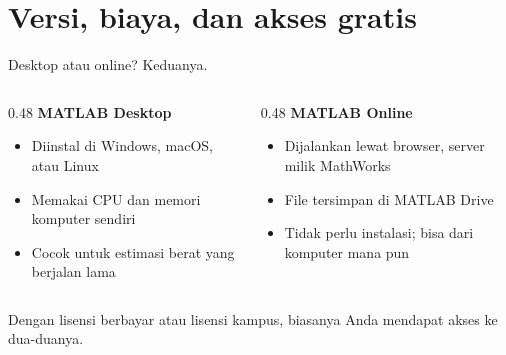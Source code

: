 \documentclass[aspectratio=169,11pt]{beamer}
\begin{document}
\section{Versi, biaya, dan akses gratis}

\begin{frame}{Desktop atau online? Keduanya.}
\begin{columns}[T]
\begin{column}{0.48\textwidth}
\textbf{MATLAB Desktop}
\begin{itemize}\small
  \item Diinstal di Windows, macOS, atau Linux
  \item Memakai CPU dan memori komputer sendiri
  \item Cocok untuk estimasi berat yang berjalan lama
\end{itemize}
\end{column}
\begin{column}{0.48\textwidth}
\textbf{MATLAB Online}
\begin{itemize}\small
  \item Dijalankan lewat browser, server milik MathWorks
  \item File tersimpan di MATLAB Drive
  \item Tidak perlu instalasi; bisa dari komputer mana pun
\end{itemize}
\end{column}
\end{columns}
\vspace{0.8em}
Dengan lisensi berbayar atau lisensi kampus, biasanya Anda mendapat akses ke
\alert{dua-duanya}.
\end{frame}
\end{document}
